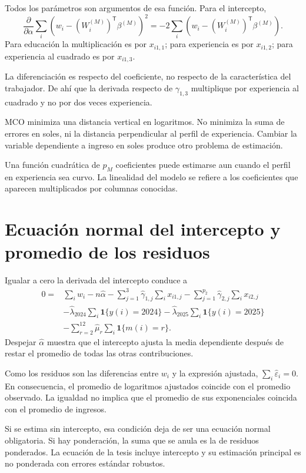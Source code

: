 \documentclass[11pt,a4paper]{article}
\begin{document}
Todos los parámetros son argumentos de esa función. Para el intercepto,
\[
\frac{\partial}{\partial\alpha}\sum_i(w_i-(W_i^{(M)})^{\mathsf T}\beta^{(M)})^2
=-2\sum_i(w_i-(W_i^{(M)})^{\mathsf T}\beta^{(M)}).
\]
Para educación la multiplicación es por $x_{i1,1}$; para experiencia es por $x_{i1,2}$; para experiencia al cuadrado es por $x_{i1,3}$.

La diferenciación es respecto del coeficiente, no respecto de la característica del trabajador. De ahí que la derivada respecto de $\gamma_{1,3}$ multiplique por experiencia al cuadrado y no por dos veces experiencia.

MCO minimiza una distancia vertical en logaritmos. No minimiza la suma de errores en soles, ni la distancia perpendicular al perfil de experiencia. Cambiar la variable dependiente a ingreso en soles produce otro problema de estimación.

Una función cuadrática de $p_M$ coeficientes puede estimarse aun cuando el perfil en experiencia sea curvo. La linealidad del modelo se refiere a los coeficientes que aparecen multiplicados por columnas conocidas.

\clearpage
\section{Ecuación normal del intercepto y promedio de los residuos}

Igualar a cero la derivada del intercepto conduce a
\[
\begin{aligned}
0={}&\sum_iw_i-n\widehat\alpha
-\sum_{j=1}^3\widehat\gamma_{1,j}\sum_ix_{i1,j}
-\sum_{j=1}^{p_2}\widehat\gamma_{2,j}\sum_ix_{i2,j}\\
&-\widehat\lambda_{2024}\sum_i\mathbf1\{y(i)=2024\}
-\widehat\lambda_{2025}\sum_i\mathbf1\{y(i)=2025\}\\
&-\sum_{r=2}^{12}\widehat\mu_r\sum_i\mathbf1\{m(i)=r\}.
\end{aligned}
\]
Despejar $\widehat\alpha$ muestra que el intercepto ajusta la media dependiente después de restar el promedio de todas las otras contribuciones.

Como los residuos son las diferencias entre $w_i$ y la expresión ajustada, $\sum_i\widehat\varepsilon_i=0$. En consecuencia, el promedio de logaritmos ajustados coincide con el promedio observado. La igualdad no implica que el promedio de sus exponenciales coincida con el promedio de ingresos.

Si se estima sin intercepto, esa condición deja de ser una ecuación normal obligatoria. Si hay ponderación, la suma que se anula es la de residuos ponderados. La ecuación de la tesis incluye intercepto y su estimación principal es no ponderada con errores estándar robustos.
\end{document}
